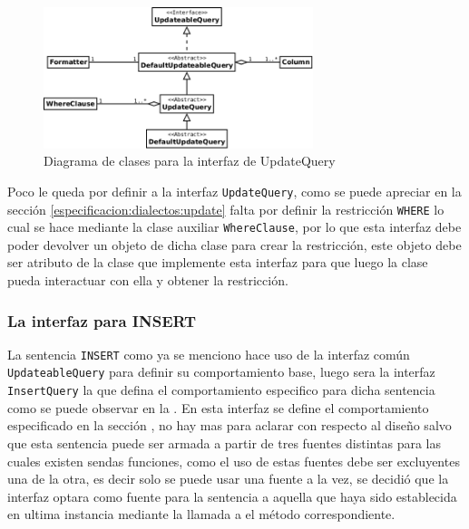 \begin{figure}
  \centering
    \includegraphics[width=0.7\textwidth]{figuras/jdbgm-dc-update.png}
  \caption{Diagrama de clases para la interfaz de UpdateQuery}
  \label{fig:dc-updatequery}
\end{figure}

Poco le queda por definir a la interfaz \verb=UpdateQuery=, como se puede apreciar en la sección \ref{especificacion:dialectos:update} falta por definir la restricción \verb=WHERE= lo cual se hace mediante la clase auxiliar \verb=WhereClause=, por lo que esta interfaz debe poder devolver un objeto de dicha clase para crear la restricción, este objeto debe ser atributo de la clase que implemente esta interfaz para que luego la clase pueda interactuar con ella y obtener la restricción. 

\subsubsection{La interfaz para INSERT}

La sentencia \verb=INSERT= como ya se menciono hace uso de la interfaz común \verb=UpdateableQuery= para definir su comportamiento base, luego sera la interfaz \verb=InsertQuery= la que defina el comportamiento especifico para dicha sentencia como se puede observar en la . En esta interfaz se define el comportamiento especificado en la sección \pageref{especificacion:dialectos:insert}, no hay mas para aclarar con respecto al diseño salvo que esta sentencia puede ser armada a partir de tres fuentes distintas para las cuales existen sendas funciones, como el uso de estas fuentes debe ser excluyentes una de la otra, es decir solo se puede usar una fuente a la vez, se decidió que la interfaz optara como fuente para la sentencia a aquella que haya sido establecida en ultima instancia mediante la llamada a el método correspondiente.

